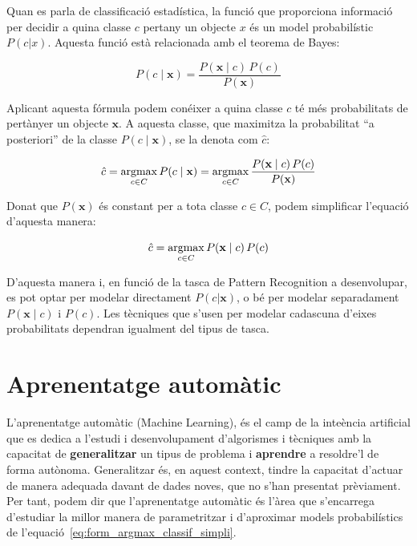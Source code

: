 Quan es parla de classificació estadística, la funció que proporciona informació per decidir a quina classe $c$ pertany un objecte $x$ és un model probabilístic $P(c|x)$. Aquesta funció està relacionada amb el teorema de Bayes:

\begin{equation}\label{eq:teor_bayes}
    P(c \mid \textbf{x}) = \frac{P(\textbf{x} \mid c) \, P(c)}{P(\textbf{x})}
\end{equation}

Aplicant aquesta fórmula podem conéixer a quina classe $c$ té més probabilitats de pertànyer un objecte $\textbf{x}$. A aquesta classe, que maximitza la probabilitat ``a posteriori'' de la classe $P(c \mid \textbf{x})$, se la denota com $\hat{c}$:

\begin{equation}\label{eq:form_argmax_classif}
    \hat{c} = \operatorname*{argmax}_{c \in C} P(c \mid \textbf{x}) = \operatorname*{argmax}_{c \in C} \frac{P(\textbf{x} \mid c) \, P(c)}{P(\textbf{x})}
\end{equation}

Donat que $P(\textbf{x})$ és constant per a tota classe $c \in C$, podem simplificar l'equació d'aquesta manera:

\begin{equation}\label{eq:form_argmax_classif_simpli}
	\hat{c} = \operatorname*{argmax}_{c \in C} P(\textbf{x} \mid c) \, P(c)
\end{equation}

D'aquesta manera i, en funció de la tasca de Pattern Recognition a desenvolupar, es pot optar per modelar directament $P(c|\textbf{x})$, o bé per modelar separadament $P(\textbf{x} \mid c)$ i $P(c)$.
Les tècniques que s'usen per modelar cadascuna d'eixes probabilitats dependran igualment del tipus de tasca.


\section{Aprenentatge automàtic}
\label{cap02_aprenentatge_maquina}

L'aprenentatge automàtic (Machine Learning), és el camp de la inte\lgem ència artificial que es dedica a l'estudi i desenvolupament d'algorismes i tècniques amb la capacitat de \textbf{generalitzar} un tipus de problema i \textbf{aprendre} a resoldre'l de forma autònoma.
Generalitzar és, en aquest context, tindre la capacitat d'actuar de manera adequada davant de dades noves, que no s'han presentat prèviament. 
Per tant, podem dir que l'aprenentatge automàtic és l'àrea que s'encarrega d'estudiar la millor manera de parametritzar i d'aproximar models probabilístics de l'equació~\ref{eq:form_argmax_classif_simpli}.

